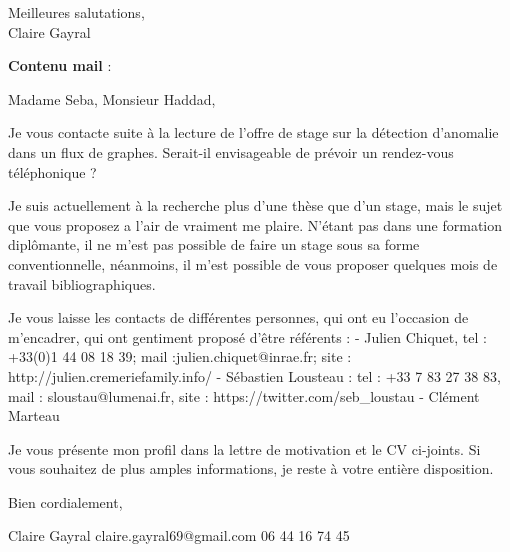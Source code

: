 \documentclass[a4paper,11pt]{article}
\begin{document}
Meilleures salutations, \\

Claire Gayral

\vspace{2cm}
\textbf{Contenu mail} : 


 Madame Seba, Monsieur Haddad,

Je vous contacte suite à la lecture de l'offre de stage sur la détection d'anomalie dans un flux de graphes. Serait-il  envisageable de prévoir un rendez-vous téléphonique ? 

Je suis actuellement à la recherche plus d'une thèse que d'un stage, mais le sujet que vous proposez a l'air de vraiment me plaire. N'étant pas dans une formation diplômante, il ne m'est pas possible de faire un stage sous sa forme conventionnelle, néanmoins, il m'est possible de vous proposer quelques mois de travail bibliographiques. 

Je vous laisse les contacts de différentes personnes, qui ont eu l'occasion de m'encadrer, qui ont gentiment proposé d'être référents : 
- Julien Chiquet, tel : +33(0)1 44 08 18 39; mail :julien.chiquet@inrae.fr; site : http://julien.cremeriefamily.info/
- Sébastien Lousteau : tel : +33 7 83 27 38 83, mail : sloustau@lumenai.fr, site : https://twitter.com/seb_loustau
- Clément Marteau 

Je vous présente mon profil dans la lettre de motivation et le CV ci-joints. Si vous souhaitez de plus amples informations, je reste à votre entière disposition.  

Bien cordialement, 

Claire Gayral
claire.gayral69@gmail.com
06 44 16 74 45 
\end{document}
